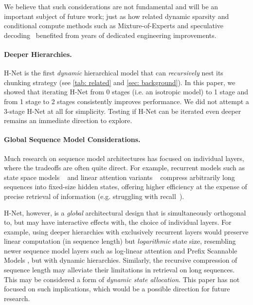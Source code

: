 \documentclass{article}
\newcommand{\citep}{\parencite}
\theoremstyle{plain}
\theoremstyle{remark}
\begin{document}
We believe that such considerations are not fundamental and will be an important subject of future work;
just as how related dynamic sparsity and conditional compute methods such as Mixture-of-Experts and speculative decoding~\citep{SpeculativeDecoding, SpeculativeSampling} benefited from years of dedicated engineering improvements.

\paragraph{Deeper Hierarchies.}
H-Net is the first \emph{dynamic} hierarchical model that can \emph{recursively} nest its chunking strategy (see \cref{tab: related} and \cref{sec: background}).
In this paper, we showed that iterating H-Net from 0 stages (i.e. an isotropic model) to 1 stage and from 1 stage to 2 stages  consistently improves performance.
We did not attempt a 3-stage H-Net at all for simplicity. Testing if H-Net can be iterated even deeper remains an immediate direction to explore. 

\paragraph{Global Sequence Model Considerations.}
Much research on sequence model architectures has focused on individual layers, where the tradeoffs are often quite direct.
For example, recurrent models such as state space models ~\citep{gu2023thesis, Mamba} and linear attention variants ~\citep{LA, GLA, DeltaNet, GatedDeltaNet} compress arbitrarily long sequences into fixed-size hidden states, offering higher efficiency at the expense of precise retrieval of information (e.g. struggling with recall~\citep{RepeatAfterMe}).

H-Net, however, is a \emph{global} architectural design that is simultaneously orthogonal to, but may have interactive effects with, the choice of individual layers.
For example, using deeper hierarchies with exclusively recurrent layers would preserve linear computation (in sequence length) but \emph{logarithmic} state size, resembling newer sequence model layers such as log-linear attention \citep{LogLinearAttn} and Prefix Scannable Models \citep{PrefixScannableModels}, but with dynamic hierarchies.
Similarly, the recursive compression of sequence length may alleviate their limitations in retrieval on long sequences.
This may be considered a form of \emph{dynamic state allocation}.
This paper has not focused on such implications, which would be a possible direction for future research.
\end{document}
